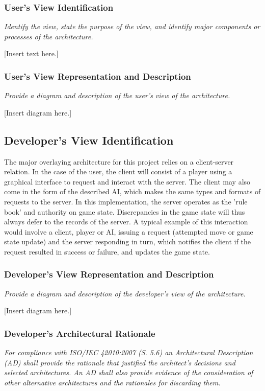 \documentclass[twoside,letterpaper]{article}
\begin{document}
\subsubsection{User's View Identification}
{\itshape\color{black}
Identify the view, state the purpose of the view, and identify major
components or processes of the architecture.}

[Insert text here.]

\subsubsection{User's View Representation and Description}
{\itshape\color{black}
Provide a diagram and description of the user{\textquoteright}s view of
the architecture.}

[Insert diagram here.]

\subsection{Developer's View Identification}
The major overlaying architecture for this project relies on a client-server relation. In the case of the user, the client will consist of a player using a graphical interface to request and interact with the server. The client may also come in the form of the described AI, which makes the same types and formats of requests to the server. In this implementation, the server operates as the 'rule book' and authority on game state. Discrepancies in the game state will thus always defer to the records of the server. A typical example of this interaction would involve a client, player or AI, issuing a request (attempted move or game state update) and the server responding in turn, which notifies the client if the request resulted in success or failure, and updates the game state.

\subsubsection{Developer's View Representation and Description}
{\itshape\color{black}
Provide a diagram and description of the developer{\textquoteright}s
view of the architecture.}

[Insert diagram here.]

\subsubsection{Developer's Architectural Rationale}
{\itshape\color{black}
For compliance with ISO/IEC 42010:2007 (S. 5.6) an Architectural
Description (AD) shall provide the rationale that justified the
architect{\textquoteright}s decisions and selected architectures. An AD
shall also provide evidence of the consideration of other alternative
architectures and the rationales for discarding them.}
\end{document}
